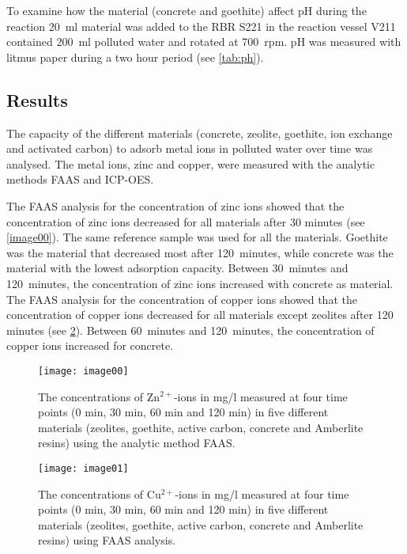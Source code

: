 To examine how the material (concrete and goethite) affect pH during the reaction 20~ml material was added to the RBR S221 in the reaction vessel V211 contained 200~ml polluted water and rotated at 700~rpm. pH was measured with litmus paper during a two hour period (see \cref{tab:ph}). 

\subsection{Results}
The capacity of the different materials (concrete, zeolite, goethite, ion exchange and activated carbon) to adsorb metal ions in polluted water over time was analysed. The metal ions, zinc and copper, were measured with the analytic methods FAAS and ICP-OES.

The FAAS analysis for the concentration of zinc ions showed that the concentration of zinc ions decreased for all materials after 30 minutes (see \cref{image00}). The same reference sample was used for all the materials. Goethite was the material that decreased most after 120~minutes, while concrete was the material with the lowest adsorption capacity. Between 30~minutes and 120~minutes, the concentration of zinc ions increased with concrete as material. The FAAS analysis for the concentration of copper ions showed that the concentration of copper ions decreased for all materials except zeolites after 120 minutes (see \cref{fig:image01}). Between 60~minutes and 120~minutes, the concentration of copper ions increased for concrete.

\begin{figure}[H]
    \centering
    \texttt{[image: image00]}
    \caption{The concentrations of Zn$^{2+}$-ions in mg/l measured at four time
        points (0 min, 30 min, 60 min and 120 min) in five different materials
            (zeolites, goethite, active carbon, concrete and Amberlite resins)
            using the analytic method FAAS.}\label{fig:image00}
\end{figure}


\begin{figure}[H]
    \centering
    \texttt{[image: image01]}
    \caption{The concentrations of Cu$^{2+}$-ions in mg/l measured at four time
        points (0 min, 30 min, 60 min and 120 min) in five different materials
            (zeolites, goethite, active carbon, concrete and Amberlite resins)
            using FAAS analysis.}\label{fig:image01}
\end{figure}

